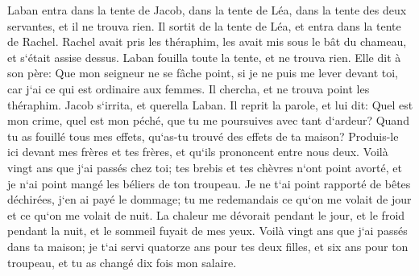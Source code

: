 \verse Laban entra dans la tente de Jacob, dans la tente de Léa, dans la tente des deux servantes, et il ne trouva rien. Il sortit de la tente de Léa, et entra dans la tente de Rachel. 
\verse Rachel avait pris les théraphim, les avait mis sous le bât du chameau, et s`était assise dessus. Laban fouilla toute la tente, et ne trouva rien. 
\verse Elle dit à son père: Que mon seigneur ne se fâche point, si je ne puis me lever devant toi, car j`ai ce qui est ordinaire aux femmes. Il chercha, et ne trouva point les théraphim. 
\verse Jacob s`irrita, et querella Laban. Il reprit la parole, et lui dit: Quel est mon crime, quel est mon péché, que tu me poursuives avec tant d`ardeur? 
\verse Quand tu as fouillé tous mes effets, qu`as-tu trouvé des effets de ta maison? Produis-le ici devant mes frères et tes frères, et qu`ils prononcent entre nous deux. 
\verse Voilà vingt ans que j`ai passés chez toi; tes brebis et tes chèvres n`ont point avorté, et je n`ai point mangé les béliers de ton troupeau. 
\verse Je ne t`ai point rapporté de bêtes déchirées, j`en ai payé le dommage; tu me redemandais ce qu`on me volait de jour et ce qu`on me volait de nuit. 
\verse La chaleur me dévorait pendant le jour, et le froid pendant la nuit, et le sommeil fuyait de mes yeux. 
\verse Voilà vingt ans que j`ai passés dans ta maison; je t`ai servi quatorze ans pour tes deux filles, et six ans pour ton troupeau, et tu as changé dix fois mon salaire. 
